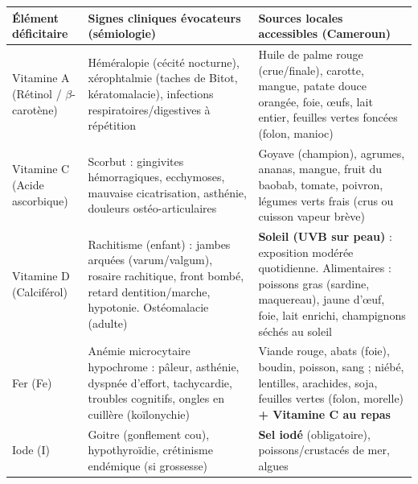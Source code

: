 \documentclass[11pt]{article}
\begin{document}
\begin{center}
\begin{tabularx}{\linewidth}{|l|X|X|}
\hline
\rowcolor{popblueL} \textbf{Élément déficitaire} & \textbf{Signes cliniques évocateurs (sémiologie)} & \textbf{Sources locales accessibles (Cameroun)} \\
\hline
Vitamine A (Rétinol / $\beta$-carotène) & Héméralopie (cécité nocturne), xérophtalmie (taches de Bitot, kératomalacie), infections respiratoires/digestives à répétition & Huile de palme rouge (crue/finale), carotte, mangue, patate douce orangée, foie, œufs, lait entier, feuilles vertes foncées (folon, manioc) \\
\hline
Vitamine C (Acide ascorbique) & Scorbut : gingivites hémorragiques, ecchymoses, mauvaise cicatrisation, asthénie, douleurs ostéo-articulaires & Goyave (champion), agrumes, ananas, mangue, fruit du baobab, tomate, poivron, légumes verts frais (crus ou cuisson vapeur brève) \\
\hline
Vitamine D (Calciférol) & Rachitisme (enfant) : jambes arquées (varum/valgum), rosaire rachitique, front bombé, retard dentition/marche, hypotonie. Ostéomalacie (adulte) & \textbf{Soleil (UVB sur peau)} : exposition modérée quotidienne. Alimentaires : poissons gras (sardine, maquereau), jaune d'œuf, foie, lait enrichi, champignons séchés au soleil \\
\hline
Fer (Fe) & Anémie microcytaire hypochrome : pâleur, asthénie, dyspnée d'effort, tachycardie, troubles cognitifs, ongles en cuillère (koïlonychie) & Viande rouge, abats (foie), boudin, poisson, sang ; niébé, lentilles, arachides, soja, feuilles vertes (folon, morelle) \textbf{+ Vitamine C au repas} \\
\hline
Iode (I) & Goitre (gonflement cou), hypothyroïdie, crétinisme endémique (si grossesse) & \textbf{Sel iodé} (obligatoire), poissons/crustacés de mer, algues \\
\hline
\end{tabularx}
\end{center}
\end{document}

